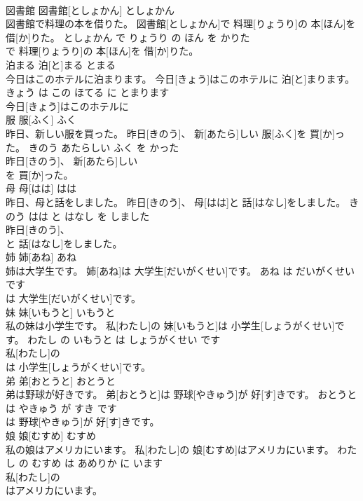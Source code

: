 \documentclass[8pt]{extreport}
\begin{document}
\begin{CJK}{UTF8}{min}
\\	図書館	図書館[としょかん]	としょかん	
\\	図書館で料理の本を借りた。	図書館[としょかん]で 料理[りょうり]の 本[ほん]を 借[か]りた。	としょかん で りょうり の ほん を かりた	
\\	で 料理[りょうり]の 本[ほん]を 借[か]りた。			
\\	泊まる	泊[と]まる	とまる	
\\	今日はこのホテルに泊まります。	今日[きょう]はこのホテルに 泊[と]まります。	きょう は この ほてる に とまります	
\\	今日[きょう]はこのホテルに
\\	服	服[ふく]	ふく	
\\	昨日、新しい服を買った。	昨日[きのう]、 新[あたら]しい 服[ふく]を 買[か]った。	きのう あたらしい ふく を かった	
\\	昨日[きのう]、 新[あたら]しい
\\	を 買[か]った。			
\\	母	母[はは]	はは	
\\	昨日、母と話をしました。	昨日[きのう]、 母[はは]と 話[はなし]をしました。	きのう はは と はなし を しました	
\\	昨日[きのう]、
\\	と 話[はなし]をしました。			
\\	姉	姉[あね]	あね	
\\	姉は大学生です。	姉[あね]は 大学生[だいがくせい]です。	あね は だいがくせい です	
\\	は 大学生[だいがくせい]です。			
\\	妹	妹[いもうと]	いもうと	
\\	私の妹は小学生です。	私[わたし]の 妹[いもうと]は 小学生[しょうがくせい]です。	わたし の いもうと は しょうがくせい です	
\\	私[わたし]の
\\	は 小学生[しょうがくせい]です。			
\\	弟	弟[おとうと]	おとうと	
\\	弟は野球が好きです。	弟[おとうと]は 野球[やきゅう]が 好[す]きです。	おとうと は やきゅう が すき です	
\\	は 野球[やきゅう]が 好[す]きです。			
\\	娘	娘[むすめ]	むすめ	
\\	私の娘はアメリカにいます。	私[わたし]の 娘[むすめ]はアメリカにいます。	わたし の むすめ は あめりか に います	
\\	私[わたし]の
\\	はアメリカにいます。			

\end{CJK}
\end{document}
